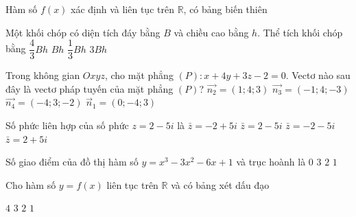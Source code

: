 \begin{ex}%
Hàm số $f(x)$ xác định và liên tục trên $\mathbb{R}$, có bảng biến thiên 
{

}

\end{ex}
\begin{ex}%
Một khối chóp có diện tích đáy bằng $B$ và chiều cao bằng $h$. Thể tích khối chóp bằng
\choice
{$\dfrac{4}{3} B h$}
{$B h$}
{\True $\dfrac{1}{3} B h$}
{$3 B h$}

\end{ex}
\begin{ex}%
Trong không gian $O x y z$, cho mặt phẳng $(P)\colon x+4 y+3 z-2=0$. Vectơ nào sau đây là vectơ pháp tuyến của mặt phẳng $(P)$?
\choice
{\True $\overrightarrow{n_2}=(1; 4; 3)$}
{$\overrightarrow{n_3}=(-1; 4;-3)$}
{$\overrightarrow{n_4}=(-4; 3;-2)$}
{$\vec{n}_1=(0;-4; 3)$}

\end{ex}
\begin{ex}%
Số phức liên hợp của số phức $z=2-5 i$ là
\choice
{$\bar{z}=-2+5 i$}
{$\bar{z}=2-5 i$}
{$\bar{z}=-2-5 i$}
{\True $\bar{z}=2+5 i$}

\end{ex}
\begin{ex}%
Số giao điểm của đồ thị hàm số $y=x^3-3 x^2-6 x+1$ và trục hoành là
\choice
{$0$}
{\True $3$}
{$2$}
{$1$}

\end{ex}
\begin{ex}%
Cho hàm số $y=f(x)$ liên tục trên $\mathbb{R}$ và có bảng xét dấu đạo 
{
}
\choice
{\True $4$}
{$3$}
{$2$}
{$1$}
\end{ex}
